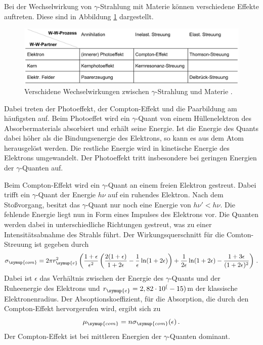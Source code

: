 Bei der Wechselwirkung von $\gamma$-Strahlung mit Materie können verschiedene
Effekte auftreten. Diese sind in Abbildung \ref{fig:wechselwirkung} dargestellt.

\begin{figure}
  \centering
  \includegraphics[width=\textwidth]{data/wechselwirkung.png}
  \caption{Verschidene Wechselwirkungen zwischen $\gamma$-Strahlung und Materie \cite{Versuchsanleitung}.}
  \label{fig:wechselwirkung}
\end{figure}

Dabei treten der Photoeffekt, der Compton-Effekt und die Paarbildung am häufigsten auf.
Beim Photoeffet wird ein $\gamma$-Quant von einem Hüllenelektron des Absorbermaterials
absorbiert und erhält seine Energie. Ist die Energie des Quants dabei höher als die
Bindungsenergie des Elektrons, so kann es aus dem Atom herausgelöst werden. Die
restliche Energie wird in kinetische Energie des Elektrons umgewandelt. Der Photoeffekt
tritt insbesondere bei geringen Energien der $\gamma$-Quanten auf.

Beim Compton-Effekt wird ein $\gamma$-Quant an einem freien Elektron gestreut.
Dabei trifft ein $\gamma$-Quant der Energie $h \nu$ auf ein ruhendes Elektron.
Nach dem Stoßvorgang, besitzt das $\gamma$-Quant nur noch eine Energie von $h \nu' < h \nu$.
Die fehlende Energie liegt nun in Form eines Impulses des Elektrons vor. Die Quanten
werden dabei in unterschiedliche Richtungen gestreut, was zu einer Intensitätsabnahme
des Strahls führt. Der Wirkungsquerschnitt für die Comton-Streuung ist gegeben
durch
\begin{equation}
  \sigma_{\symup{com}}= 2 \pi r_{\symup{e}}^2 \left(\frac{1+\epsilon}{\epsilon^2}
  \left(\frac{2(1+\epsilon)}{1+2\epsilon}-\frac{1}{\epsilon}\ln(1+2\epsilon)\right)
  +\frac{1}{2\epsilon}\ln(1+2\epsilon)-\frac{1+3\epsilon}{(1+2\epsilon)^2}\right) \,.
  \label{eqn:sigma_compton}
\end{equation}
Dabei ist $\epsilon$ das Verhältnis zwischen der Energie des $\gamma$-Quants und
der Ruheenergie des Elektrons und $r_{\symup{e}} = 2,82 \cdot 10^(-15)$m%
der klassische Elektronenradius. Der Absoptionskoeffizient, für die Absorption, die
durch den Compton-Effekt hervorgerufen wird, ergibt sich zu
\begin{equation}
  \mu_{\symup{com}}=n \sigma_{\symup{com}}(\epsilon) \,.
\end{equation}
Der Compton-Effekt ist bei mittleren Energien der $\gamma$-Quanten dominant.

